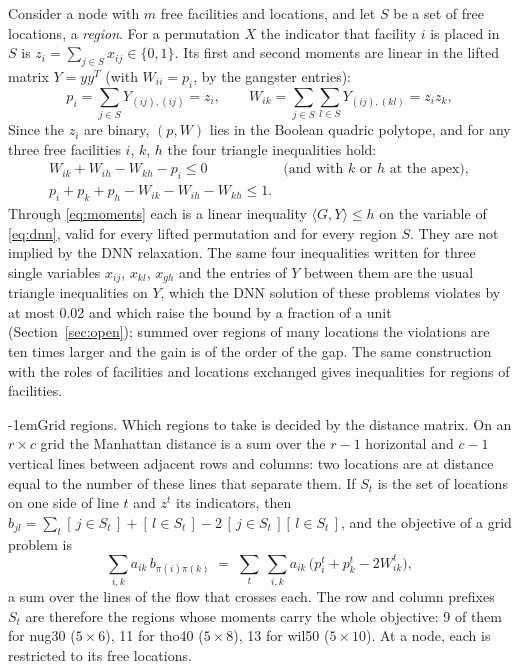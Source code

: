 \documentclass[10pt]{article}
\makeatletter
\renewcommand\paragraph{\@startsection{paragraph}{4}{\z@}{2.5ex plus 1ex minus .2ex}%
  {-1em}{\normalfont\normalsize\bfseries}}
\theoremstyle{remark}
\newcommand{\inner}[2]{\langle #1, #2\rangle}
\makeatother
\begin{document}
Consider a node with $m$ free facilities and locations, and let $S$ be a set of free
locations, a \emph{region}. For a permutation $X$ the indicator that facility $i$ is
placed in $S$ is $z_i = \sum_{j\in S}x_{ij}\in\{0,1\}$. Its first and second moments
are linear in the lifted matrix $Y = yy^T$
(with $W_{ii} = p_i$, by the gangster entries):
\begin{equation}\label{eq:moments}
  p_i = \sum_{j\in S} Y_{(ij),(ij)} = z_i, \qquad
  W_{ik} = \sum_{j\in S}\sum_{l\in S} Y_{(ij),(kl)} = z_iz_k ,
\end{equation}
Since the $z_i$ are binary, $(p,W)$ lies in the Boolean quadric polytope, and for any
three free facilities $i$, $k$, $h$ the four triangle inequalities hold:
\begin{equation}\label{eq:triangles}
  \begin{array}{rl}
  W_{ik} + W_{ih} - W_{kh} - p_i \le 0 & \text{(and with $k$ or $h$ at the apex)},\\[2pt]
  p_i + p_k + p_h - W_{ik} - W_{ih} - W_{kh} \le 1.
  \end{array}
\end{equation}
Through \eqref{eq:moments} each is a linear inequality $\inner{G}{Y}\le h$ on the
variable of \eqref{eq:dnn}, valid for every lifted permutation and for every region
$S$. They are not implied by the DNN relaxation. The same four inequalities
written for three single variables $x_{ij}$, $x_{kl}$, $x_{gh}$ and the entries of
$Y$ between them are the usual triangle inequalities on $Y$, which the DNN solution
of these problems violates by at most 0.02 and which raise the bound by a fraction
of a unit (Section~\ref{sec:open}); summed over regions of many locations the
violations are ten times larger and the gain is of the order of the gap. The same construction with the
roles of facilities and locations exchanged gives inequalities for regions of
facilities.

\paragraph{Grid regions.} Which regions to take is decided by the distance matrix.
On an $r\times c$ grid the Manhattan distance is a sum over the $r-1$ horizontal and
$c-1$ vertical lines between adjacent rows and columns: two locations are at
distance equal to the number of these lines that separate them. If $S_t$ is the set of
locations on one side of line $t$ and $z^t$ its indicators, then
$b_{jl} = \sum_t [\,j\in S_t\,] + [\,l\in S_t\,] - 2\,[\,j\in S_t\,][\,l\in S_t\,]$, and the
objective of a grid problem is
\begin{equation}\label{eq:cutsum}
  \sum_{i,k} a_{ik}\,b_{\pi(i)\pi(k)} \;=\; \sum_t\ \sum_{i,k} a_{ik}\,\big(p^t_i + p^t_k - 2W^t_{ik}\big),
\end{equation}
a sum over the lines of the flow that crosses each. The row and column prefixes
$S_t$ are therefore the regions whose moments carry the whole objective: 9 of them
for nug30 ($5\times6$), 11 for tho40 ($5\times8$), 13 for wil50 ($5\times10$). At a node, each
is restricted to its free locations.
\end{document}
